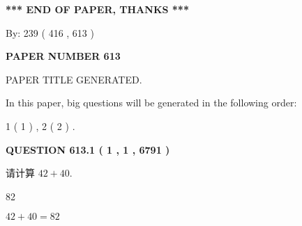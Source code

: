 \documentclass{ctexart}
\begin{document}
   
   
   
\vspace{1.0in} 
{\textbf{\large{ *** END OF PAPER, THANKS *** }}} 
   
   
\hspace{1.0in} By: 
 239 ( 416 ,  613 )
   
   
   
   
\newpage 
\setcounter{page}{ 
   613001 } 
   
   
   
   
 {\textbf{ \Large{ PAPER NUMBER  613  }}}
   
   
\vspace{0.2in}
   
   
   
   
   
   
   
   
 \vspace{0.2in}
 
 
 
 
   
   
 PAPER TITLE GENERATED.
   
   
   
\vspace{0.2in}
   
In this paper, big questions will be generated in the following order: 
   
   
   1 ( 1 )
 ,
   2 ( 2 )
 .
  
\vspace{0.2in}
  
{\textbf{\Large{QUESTION
613.1 
 ( 1 , 1 , 6791 )
}}}
  
  
 
请计算 $ %
42 +  %
40 $.
 
 
 
\noindent{}
 
 

82
 
 
\noindent{}
 
 

 
 
 
\noindent{}
 
 

$ %
42 +  %
40=   %
82$
 
\end{document}
